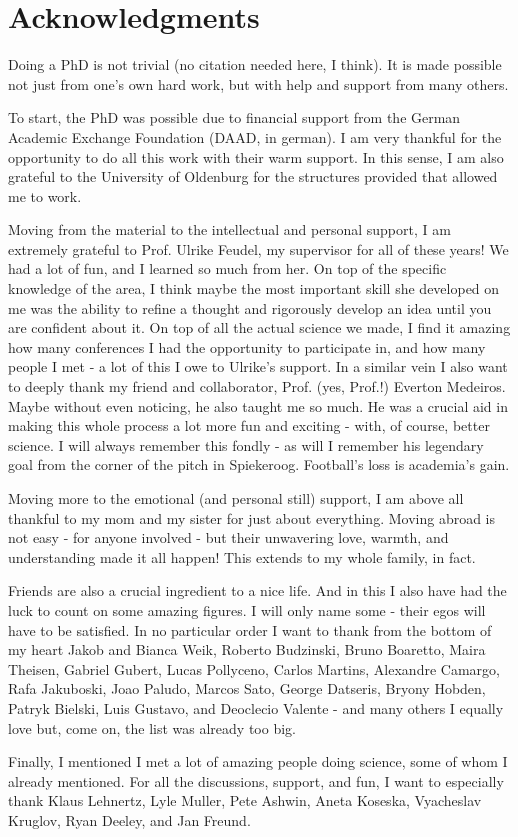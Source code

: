 \chapter*{Acknowledgments}

Doing a PhD is not trivial (no citation needed here, I think). It is made possible not just from one's own hard work, but with help and support from many others. 

To start, the PhD was possible due to financial support from the German Academic Exchange Foundation (DAAD, in german). I am very thankful for the opportunity to do all this work with their warm support. In this sense, I am also grateful to the University of Oldenburg for the structures provided that allowed me to work. 

Moving from the material to the intellectual and personal support, I am extremely grateful to Prof. Ulrike Feudel, my supervisor for all of these years! We had a lot of fun, and I learned so much from her. On top of the specific knowledge of the area, I think maybe the most important skill she developed on me was the ability to refine a thought and rigorously develop an idea until you are confident about it. On top of all the actual science we made, I find it amazing how many conferences I had the opportunity to participate in, and how many people I met - a lot of this I owe to Ulrike's support. In a similar vein I also want to deeply thank my friend and collaborator, Prof. (yes, Prof.!) Everton Medeiros. Maybe without even noticing, he also taught me so much. He was a crucial aid in making this whole process a lot more fun and exciting - with, of course, better science. I will always remember this fondly - as will I remember his legendary goal from the corner of the pitch in Spiekeroog. Football's loss is academia's gain.       

Moving more to the emotional (and personal still) support, I am above all thankful to my mom and my sister for just about everything. Moving abroad is not easy - for anyone involved - but their unwavering love, warmth, and understanding made it all happen! This extends to my whole family, in fact. 

Friends are also a crucial ingredient to a nice life. And in this I also have had the luck to count on some amazing figures. I will only name some - their egos will have to be satisfied. In no particular order I want to thank from the bottom of my heart Jakob and Bianca Weik, Roberto Budzinski, Bruno Boaretto, Maira Theisen, Gabriel Gubert, Lucas Pollyceno, Carlos Martins, Alexandre Camargo, Rafa Jakuboski, Joao Paludo, Marcos Sato, George Datseris, Bryony Hobden, Patryk Bielski, Luis Gustavo, and Deoclecio Valente - and many others I equally love but, come on, the list was already too big. 

Finally, I mentioned I met a lot of amazing people doing science, some of whom I already mentioned. For all the discussions, support, and fun, I want to especially thank Klaus Lehnertz, Lyle Muller, Pete Ashwin, Aneta Koseska, Vyacheslav Kruglov, Ryan Deeley, and Jan Freund.